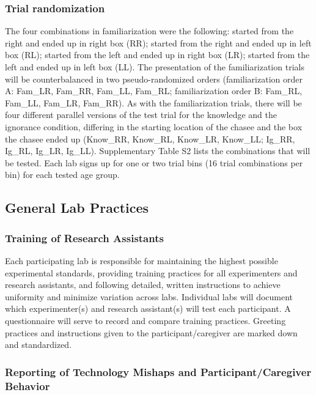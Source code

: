 \documentclass[
  english,
  man, donotrepeattitle,floatsintext]{apa6}
\begin{document}
\hypertarget{trial-randomization}{%
\subsubsection{Trial randomization}\label{trial-randomization}}

The four combinations in familiarization were the following: started from the right and ended up in right box (RR); started from the right and ended up in left box (RL); started from the left and ended up in right box (LR); started from the left and ended up in left box (LL). The presentation of the familiarization trials will be counterbalanced in two pseudo-randomized orders (familiarization order A: Fam\_LR, Fam\_RR, Fam\_LL, Fam\_RL; familiarization order B: Fam\_RL, Fam\_LL, Fam\_LR, Fam\_RR). As with the familiarization trials, there will be four different parallel versions of the test trial for the knowledge and the ignorance condition, differing in the starting location of the chasee and the box the chasee ended up (Know\_RR, Know\_RL, Know\_LR, Know\_LL; Ig\_RR, Ig\_RL, Ig\_LR, Ig\_LL). Supplementary Table S2 lists the combinations that will be tested. Each lab signs up for one or two trial bins (16 trial combinations per bin) for each tested age group.

\hypertarget{general-lab-practices}{%
\subsection{General Lab Practices}\label{general-lab-practices}}

\hypertarget{training-of-research-assistants}{%
\subsubsection{Training of Research Assistants}\label{training-of-research-assistants}}

Each participating lab is responsible for maintaining the highest possible experimental standards, providing training practices for all experimenters and research assistants, and following detailed, written instructions to achieve uniformity and minimize variation across labs. Individual labs will document which experimenter(s) and research assistant(s) will test each participant. A questionnaire will serve to record and compare training practices. Greeting practices and instructions given to the participant/caregiver are marked down and standardized.

\hypertarget{reporting-of-technology-mishaps-and-participantcaregiver-behavior}{%
\subsubsection{Reporting of Technology Mishaps and Participant/Caregiver Behavior}\label{reporting-of-technology-mishaps-and-participantcaregiver-behavior}}
\end{document}
